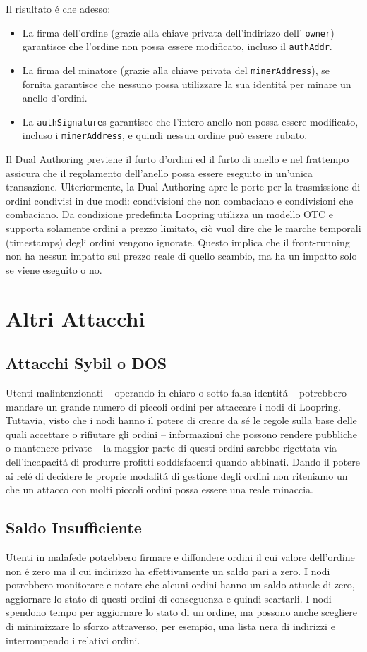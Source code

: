 \documentclass[UTF8,nofonts]{article}
\begin{document}
\begin{multicols}{2}
\begin{enumerate}
\end{enumerate}
Il risultato \'e che adesso:
\begin{itemize}
	\item  La firma dell'ordine (grazie alla chiave privata dell'indirizzo dell' \verb|owner|) garantisce che l'ordine non possa essere modificato, incluso il \verb|authAddr|.
	\item  La firma del minatore (grazie alla  chiave privata del \verb|minerAddress|), se fornita garantisce che nessuno possa utilizzare la sua identit\'a per minare un anello d'ordini.
	\item  La \verb|authSignature|s garantisce che l'intero anello non possa essere modificato, incluso i \verb|minerAddress|, e quindi nessun ordine può essere rubato.
\end{itemize}
Il Dual Authoring previene il furto d'ordini ed il furto di anello e nel frattempo assicura che il regolamento dell'anello possa essere eseguito in un'unica transazione. Ulteriormente, la Dual Authoring apre le porte per la trasmissione di ordini condivisi in due modi: condivisioni che non combaciano e condivisioni che combaciano.  Da condizione predefinita Loopring utilizza un modello OTC e supporta solamente ordini a prezzo limitato, ciò vuol dire che le marche temporali (timestamps) degli ordini vengono ignorate. Questo implica che il front-running non ha nessun impatto sul prezzo reale di quello scambio, ma ha un impatto solo se viene eseguito o no.
\section{Altri Attacchi}
\subsection{Attacchi Sybil o DOS}
Utenti malintenzionati -- operando in chiaro o sotto falsa identit\'a -- potrebbero mandare un grande numero di piccoli ordini per attaccare i nodi di Loopring. Tuttavia, visto che i nodi hanno il potere di creare da s\'e le regole sulla base delle quali accettare o rifiutare gli ordini -- informazioni che possono rendere pubbliche o mantenere private -- la maggior parte di questi ordini sarebbe rigettata via dell'incapacit\'a di produrre profitti soddisfacenti quando abbinati. Dando il potere ai rel\'e di decidere le proprie modalit\'a di gestione degli ordini non riteniamo un che un attacco con molti piccoli ordini possa essere una reale minaccia.
\subsection{Saldo Insufficiente}
Utenti in malafede potrebbero firmare e diffondere ordini il cui valore dell'ordine non \'e zero ma il cui indirizzo ha effettivamente un saldo pari a zero. I nodi potrebbero monitorare e notare che alcuni ordini hanno un saldo attuale di zero, aggiornare lo stato di questi ordini di conseguenza e quindi scartarli.
I nodi spendono tempo per aggiornare lo stato di un ordine, ma possono anche scegliere di minimizzare lo sforzo attraverso, per esempio, una lista nera di indirizzi e interrompendo i relativi ordini.

\end{multicols}
\end{document}
